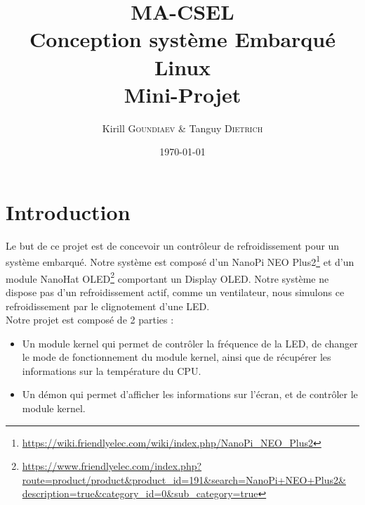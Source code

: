 \documentclass[
	a4paper, %
	10pt, %
]{CSUniSchoolLabReport}
\title{MA-CSEL \\ Conception système Embarqué Linux \\ Mini-Projet } %
\author{Kirill \textsc{Goundiaev} \& Tanguy \textsc{Dietrich}} %
\date{\today} %
\begin{document}
\maketitle %

\begin{figure}[H] %
\label{fig:speciation}
\end{figure}


\newpage

\tableofcontents
\newpage

\section{Introduction}\label{Introduction}
Le but de ce projet est de concevoir un contrôleur de refroidissement pour un système embarqué. Notre système est composé d'un NanoPi NEO Plus2\footnote{\href{https://wiki.friendlyelec.com/wiki/index.php/NanoPi_NEO_Plus2}{https://wiki.friendlyelec.com/wiki/index.php/NanoPi\_NEO\_Plus2}} et d'un module NanoHat OLED\footnote{\href{https://www.friendlyelec.com/index.php?route=product/product&product_id=191&search=NanoPi+NEO+Plus2&description=true&category_id=0&sub_category=true}{https://www.friendlyelec.com/index.php?route=product/product\&product\_id=191\&search=NanoPi+NEO+Plus2\&\\description=true\&category\_id=0\&sub\_category=true}} comportant un Display OLED. Notre système ne dispose pas d'un refroidissement actif, comme un ventilateur, nous simulons ce refroidissement par le clignotement d'une LED.\\

Notre projet est composé de 2 parties : \\
\begin{itemize}
	\item Un module kernel qui permet de contrôler la fréquence de la LED, de changer le mode de fonctionnement du module kernel, ainsi que de récupérer les informations sur la température du CPU.
	\item Un démon qui permet d'afficher les informations sur l'écran, et de contrôler le module kernel.
\end{itemize}
\end{document}

